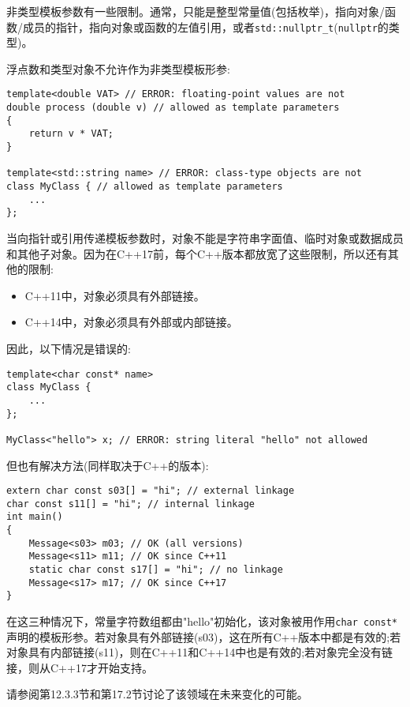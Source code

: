 非类型模板参数有一些限制。通常，只能是整型常量值(包括枚举)，指向对象/函数/成员的指针，指向对象或函数的左值引用，或者\texttt{std::nullptr\_t}(\texttt{nullptr}的类型)。

浮点数和类型对象不允许作为非类型模板形参:

\begin{lstlisting}[style=styleCXX]
template<double VAT> // ERROR: floating-point values are not
double process (double v) // allowed as template parameters
{
	return v * VAT;
}

template<std::string name> // ERROR: class-type objects are not
class MyClass { // allowed as template parameters
	...
};
\end{lstlisting}

当向指针或引用传递模板参数时，对象不能是字符串字面值、临时对象或数据成员和其他子对象。因为在C++17前，每个C++版本都放宽了这些限制，所以还有其他的限制:

\begin{itemize}
\item 
C++11中，对象必须具有外部链接。

\item 
C++14中，对象必须具有外部或内部链接。
\end{itemize}

因此，以下情况是错误的:

\begin{lstlisting}[style=styleCXX]
template<char const* name>
class MyClass {
	...
};

MyClass<"hello"> x; // ERROR: string literal "hello" not allowed
\end{lstlisting}

但也有解决方法(同样取决于C++的版本):

\begin{lstlisting}[style=styleCXX]
extern char const s03[] = "hi"; // external linkage
char const s11[] = "hi"; // internal linkage
int main()
{
	Message<s03> m03; // OK (all versions)
	Message<s11> m11; // OK since C++11
	static char const s17[] = "hi"; // no linkage
	Message<s17> m17; // OK since C++17
}
\end{lstlisting}

在这三种情况下，常量字符数组都由"hello"初始化，该对象被用作用\texttt{char const*}声明的模板形参。若对象具有外部链接(s03)，这在所有C++版本中都是有效的;若对象具有内部链接(s11)，则在C++11和C++14中也是有效的;若对象完全没有链接，则从C++17才开始支持。

请参阅第12.3.3节和第17.2节讨论了该领域在未来变化的可能。

